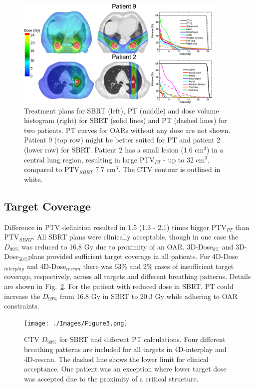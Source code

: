 \documentclass[type=dr, dr=rernat, acm$^3$entcolor=tud7b,colorbacktitle, bigchapter, openright, twoside, 12pt ]{tudthesis}
\begin{document}
\begin{figure}[H]
\begin{center}
\includegraphics[width=0.9\textwidth]{./Images/Figure2.png}
\caption{Treatment plans for SBRT (left), PT (middle) and dose volume histogram (right) for SBRT (solid lines) and PT (dashed lines) for two patients. PT curves for OARs without any dose are not shown. Patient 9 (top row) might be better suited for PT and patient 2 (lower row) for SBRT. Patient 2 has a small lesion (1.6 cm$^{3}$) in a central lung region, resulting in large PTV$_{PT}$ - up to 32 cm$^{3}$, compared to PTV$_{SBRT}$ 7.7 cm$^{3}$. The CTV contour is outlined in white.}
\label{Fig:TreatmentPlans}
\end{center}
\end{figure}

\subsection{Target Coverage}

Difference in PTV definition resulted in 1.5 (1.3 - 2.1) times bigger PTV$_{PT}$ than PTV$_{SBRT}$. All SBRT plans were clinically acceptable, though in one case the $D_{99\%}$ was reduced to 16.8 Gy due to proximity of an OAR. 3D-Dose$_{0\%}$ and 3D-Dose$_{50\%}$plans provided sufficient target coverage in all patients. For 4D-Dose$_{interplay}$ and 4D-Dose$_{rescan}$ there was 63\% and 2\% cases of insufficient target coverage, respectively, across all targets and different breathing patterns. Details are shown in Fig.~\ref{Fig:InterplayDiff}. For the patient with reduced dose in SBRT, PT could increase the $D_{99\%}$ from 16.8 Gy in SBRT to 20.3 Gy while adhering to OAR constraints. 


\begin{figure}[H]
\begin{center}
\texttt{[image: ./Images/Figure3.png]}
\caption{CTV $D_{99\%}$ for SBRT and different PT calculations. Four different breathing patterns are included for all targets in 4D-interplay and 4D-rescan. The dashed line shows the lower limit for clinical acceptance. One patient was an exception where lower target dose was accepted due to the proximity of a critical structure.  }
\label{Fig:InterplayDiff}
\end{center}
\end{figure}
\newpage
\end{document}

